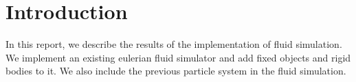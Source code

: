 \section{Introduction}
In this report, we describe the results of the implementation of fluid simulation.
We implement an existing eulerian fluid simulator and add fixed objects and rigid bodies to it.
We also include the previous particle system in the fluid simulation.